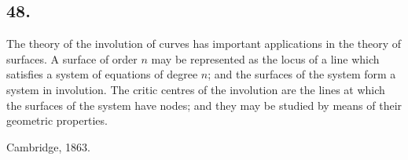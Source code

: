 \documentclass[11pt,a4paper]{article}
\theoremstyle{definition}
\begin{document}
\subsection*{48.}

The theory of the involution of curves has important applications in the theory of
surfaces. A surface of order $n$ may be represented as the locus of a line which satisfies a
system of equations of degree $n$; and the surfaces of the system form a system in involution.
The critic centres of the involution are the lines at which the surfaces of the system have
nodes; and they may be studied by means of their geometric properties.

\vspace{1em}
\noindent
Cambridge, 1863.
\end{document}
